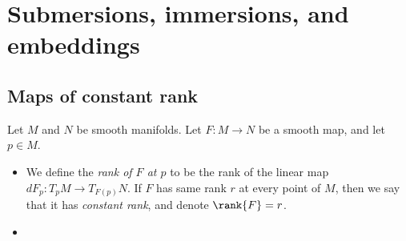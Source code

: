 
\chapter{Submersions, immersions, and embeddings}

\section{Maps of constant rank}

\begin{definition}
    Let $M$ and $N$ be smooth manifolds. Let $F : M \to N$ be a smooth map, and let $p \in M$.
    \begin{itemize}
        \item We define the \emph{rank of $F$ at $p$} to be the rank of the linear map $dF_p : T_pM \to T_{F(p)}N$. If $F$ has same rank $r$ at every point of $M$, then we say that it has \emph{constant rank}, and denote $\rank{F} = r$.
        \item $$
    \end{itemize}
\end{definition}
